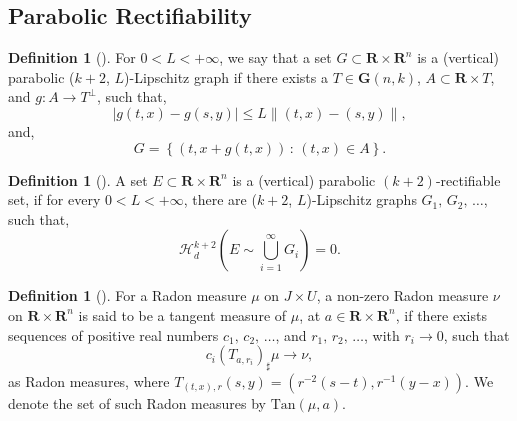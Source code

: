\documentclass{article}
\theoremstyle{plain}
\theoremstyle{definition}
\newtheorem{definition}[theorem]{Definition}
\theoremstyle{plain}
\theoremstyle{remark}
\theoremstyle{remark}
\theoremstyle{plain}
\begin{document}
\subsection{Parabolic Rectifiability}\label{subsec: parabolic rectifiability}

\begin{definition}[]\label{def: parabolic Lipschitz graph}
    For $0 < L < + \infty$, we say that a set $G \subset \mathbf{R} \times \mathbf{R}^{n}$ is a (vertical) parabolic ($k+2$, $L$)-Lipschitz graph if there exists a $T \in \mathbf{G} (n, k)$, $A \subset \mathbf{R} \times T$, and $g \colon A \rightarrow T^{\perp}$, such that, 
    \begin{equation*}
        |g (t, x) - g (s, y)| \leq L \| (t, x) - (s, y) \|,
    \end{equation*}
    and,
    \begin{equation*}
        G = \left\{ (t, x + g (t, x)) \, \colon \, (t, x) \in A \right\}.
    \end{equation*}
\end{definition}

\begin{definition}[]\label{def: parabolic rectifiability}
    A set $E \subset \mathbf{R} \times \mathbf{R}^{n}$ is a (vertical) parabolic $(k+2)$-rectifiable set, if for every $0 < L < + \infty$, there are ($k + 2$, $L$)-Lipschitz graphs $G_{1}, \, G_{2}, \, \ldots$, such that, 
    \begin{equation*}
        \mathscr{H}_{d}^{k + 2} \left( E \sim \bigcup_{i = 1}^{\infty} G_{i} \right) = 0.
    \end{equation*}
\end{definition}

\begin{definition}[]
    For a Radon measure $\mu$ on $J \times U$, a non-zero Radon measure $\nu$ on $\mathbf{R} \times \mathbf{R}^{n}$ is said to be a tangent measure of $\mu$, at $a \in \mathbf{R} \times \mathbf{R}^{n}$, if there exists sequences of positive real numbers $c_{1}, \, c_{2}, \, \ldots$, and $r_{1}, \, r_{2}, \, \ldots$, with $r_{i} \rightarrow 0$, such that
    \begin{equation*}
        c_{i} (T_{a, r_{i}})_{\sharp}\mu \rightarrow \nu,
    \end{equation*}
    as Radon measures, where $T_{(t, x), r} (s, y) = (r^{-2} (s - t), r^{-1} (y - x))$.
    We denote the set of such Radon measures by $\mathrm{Tan} (\mu, a)$.
\end{definition}
\end{document}
